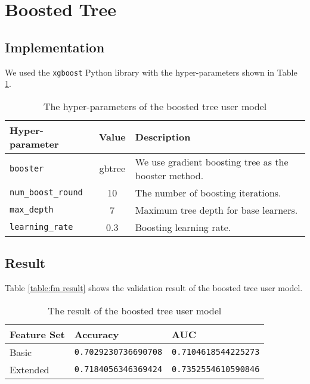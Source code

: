 \section{Boosted Tree}

    \subsection{Implementation}

        We used the \verb|xgboost|\cite{Chen2016} Python library
        with the hyper-parameters shown in Table \ref{table:xgboost param}.

        \begin{table}[hpbt]
        \centering
        \begin{tabular}{lcl}
            \hline
            Hyper-parameter & Value & Description \\
            \hline
            \verb|booster| & gbtree & We use gradient boosting tree as the booster method. \\
            \verb|num_boost_round| & 10 & The number of boosting iterations. \\
            \verb|max_depth| & 7 & Maximum tree depth for base learners. \\
            \verb|learning_rate| & 0.3 & Boosting learning rate. \\
            \hline
        \end{tabular}
        \caption{The hyper-parameters of the boosted tree user model}
        \label{table:xgboost param}
        \end{table}

    \subsection{Result}

        Table \ref{table:fm result} shows the validation result of the boosted tree user model.

        \begin{table}[hpbt]
        \centering
        \begin{tabular}{lll}
            \hline
            Feature Set & Accuracy & AUC \\
            \hline
            Basic    & \verb|0.7029230736690708| & \verb|0.7104618544225273| \\
            Extended & \verb|0.7184056346369424| & \verb|0.7352554610590846| \\
            \hline
        \end{tabular}
        \caption{The result of the boosted tree user model}
        \label{table:xgboost result}
        \end{table}

